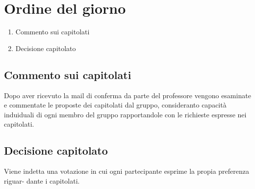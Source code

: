 \section{Ordine del giorno}
\begin{enumerate}
\item Commento sui capitolati
\item Decisione capitolato
\end{enumerate}

\subsection{Commento sui capitolati}
Dopo aver ricevuto la mail di conferma da parte del professore vengono esaminate e
commentate le proposte dei capitolati dal gruppo, consideranto capacità induiduali di
ogni membro del gruppo rapportandole con le richieste espresse nei capitolati.

\subsection{Decisione capitolato}
Viene indetta una votazione in cui ogni partecipante esprime la propia preferenza riguar-
dante i capitolati.
